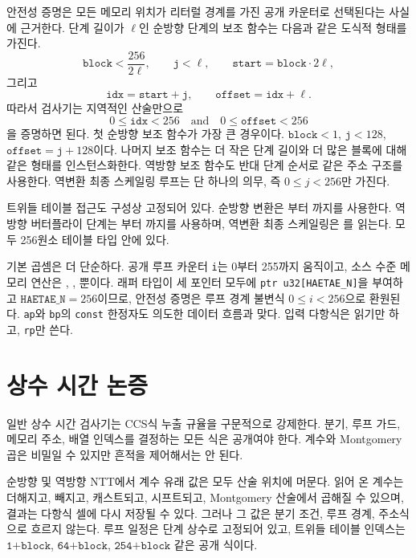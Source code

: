 \documentclass[10pt,twocolumn]{article}
\newcommand{\ct}{상수 시간}
\begin{document}
안전성 증명은 모든 메모리 위치가 리터럴 경계를 가진 공개 카운터로
선택된다는 사실에 근거한다. 단계 길이가 \(\ell\)인 순방향 단계의
보조 함수는 다음과 같은 도식적 형태를 가진다.
\[
  \texttt{block}<\frac{256}{2\ell},\qquad
  \texttt{j}<\ell,\qquad
  \texttt{start}=\texttt{block}\cdot 2\ell,
\]
그리고
\[
  \texttt{idx}=\texttt{start}+\texttt{j},\qquad
  \texttt{offset}=\texttt{idx}+\ell.
\]
따라서 검사기는 지역적인 산술만으로
\[
  0 \leq \texttt{idx}<256
  \quad\text{and}\quad
  0 \leq \texttt{offset}<256
\]
을 증명하면 된다. 첫 순방향 보조 함수가 가장 큰 경우이다.
\(\texttt{block}<1\), \(\texttt{j}<128\),
\(\texttt{offset}=\texttt{j}+128\)이다. 나머지 보조 함수는 더 작은 단계
길이와 더 많은 블록에 대해 같은 형태를 인스턴스화한다. 역방향 보조
함수도 반대 단계 순서로 같은 주소 구조를 사용한다. 역변환 최종
스케일링 루프는 단 하나의 의무, 즉 \(0\leq j<256\)만 가진다.

트위들 테이블 접근도 구성상 고정되어 있다. 순방향 변환은
부터 까지를 사용한다. 역방향
버터플라이 단계는 부터 까지를
사용하며, 역변환 최종 스케일링은 를 읽는다.
모두 256원소 테이블 타입 안에 있다.

기본 곱셈은 더 단순하다. 공개 루프 카운터 \texttt{i}는 0부터 255까지
움직이고, 소스 수준 메모리 연산은 , ,
뿐이다. 래퍼 타입이 세 포인터 모두에
\texttt{ptr u32[HAETAE\_N]}을 부여하고 \(\texttt{HAETAE\_N}=256\)이므로,
안전성 증명은 루프 경계 불변식 \(0\leq i<256\)으로 환원된다.
\texttt{ap}와 \texttt{bp}의 \texttt{const} 한정자도 의도한 데이터 흐름과
맞다. 입력 다항식은 읽기만 하고, \texttt{rp}만 쓴다.

\section{\ct{} 논증}

일반 \ct{} 검사기는 CCS식 누출 규율을 구문적으로 강제한다. 분기,
루프 가드, 메모리 주소, 배열 인덱스를 결정하는 모든 식은 공개여야
한다. 계수와 Montgomery 곱은 비밀일 수 있지만 흔적을 제어해서는
안 된다.

순방향 및 역방향 NTT에서 계수 유래 값은 모두 산술 위치에 머문다.
읽어 온 계수는 더해지고, 빼지고, 캐스트되고, 시프트되고, Montgomery
산술에서 곱해질 수 있으며, 결과는 다항식 셀에 다시 저장될 수 있다.
그러나 그 값은 분기 조건, 루프 경계, 주소식으로 흐르지 않는다. 루프
일정은 단계 상수로 고정되어 있고, 트위들 테이블 인덱스는
\(\texttt{1+block}\), \(\texttt{64+block}\),
\(\texttt{254+block}\) 같은 공개 식이다.
\end{document}
